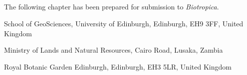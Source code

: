 \begin{refsection}




\chapter[\chaptertitle]{\chaptertitle}
\label{ch:phen}

The following chapter has been prepared for submission to \textit{Biotropica}.


\begin{paperaffil}
\item{School of GeoSciences, University of Edinburgh, Edinburgh, EH9 3FF, United Kingdom}
\item{Ministry of Lands and Natural Resources, Cairo Road, Lusaka, Zambia}
\item{Royal Botanic Garden Edinburgh, Edinburgh, EH3 5LR, United Kingdom}
\end{paperaffil}



\end{refsection}
